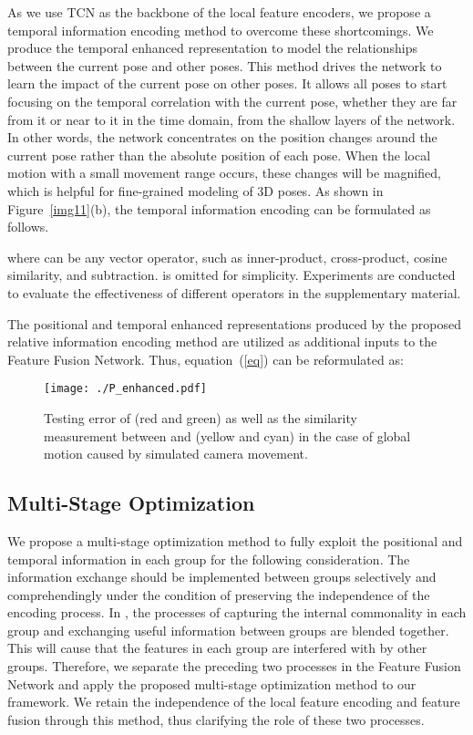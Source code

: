 \documentclass[sigconf]{acmart}
\begin{document}
As we use TCN as the backbone of the local feature encoders, we propose a temporal information encoding method to overcome these shortcomings. We produce the temporal enhanced representation to model the relationships between the current pose and other poses. This method drives the network to learn the impact of the current pose on other poses. It allows all poses to start focusing on the temporal correlation with the current pose, whether they are far from it or near to it in the time domain, from the shallow layers of the network. In other words, the network concentrates on the position changes around the current pose rather than the absolute position of each pose. When the local motion with a small movement range occurs, these changes will be magnified, which is helpful for fine-grained modeling of 3D poses. As shown in Figure~\ref{img11}(b), the temporal information encoding can be formulated as follows. 

where  can be any vector operator, such as inner-product, cross-product, cosine similarity, and subtraction.  is omitted for simplicity. Experiments are conducted to evaluate the effectiveness of different operators in the supplementary material.

The positional and temporal enhanced representations produced by the proposed relative information encoding method are utilized as additional inputs to the Feature Fusion Network. Thus, equation~(\ref{eq}) can be reformulated as:



\begin{figure}
  \centering
  \texttt{[image: ./P\_enhanced.pdf]}
  \vspace{-0.5cm}
  \caption{Testing error of  (red and green) as well as the similarity measurement between  and  (yellow and cyan) in the case of global motion caused by simulated camera movement.}
  \vspace{-0.3cm}
  \label{img6}
\end{figure}


\subsection{Multi-Stage Optimization}\label{MS}
We propose a multi-stage optimization method to fully exploit the positional and temporal information in each group for the following consideration. The information exchange should be implemented between groups selectively and comprehendingly under the condition of preserving the independence of the encoding process. In \cite{zeng2020srnet}, the processes of capturing the internal commonality in each group and exchanging useful information between groups are blended together. This will cause that the features in each group are interfered with by other groups. Therefore, we separate the preceding two processes in the Feature Fusion Network and apply the proposed multi-stage optimization method to our framework. We retain the independence of the local feature encoding and feature fusion through this method, thus clarifying the role of these two processes. 
\end{document}

